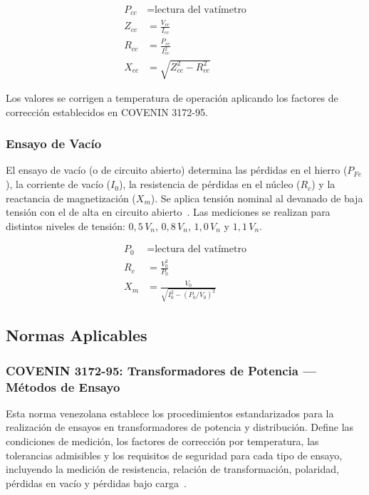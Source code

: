\begin{align}
    P_{cc} &= \text{lectura del vatímetro} \\
    Z_{cc} &= \frac{V_{cc}}{I_{cc}} \\
    R_{cc} &= \frac{P_{cc}}{I_{cc}^2} \\
    X_{cc} &= \sqrt{Z_{cc}^2 - R_{cc}^2}
\end{align}

Los valores se corrigen a temperatura de operación aplicando los factores de corrección establecidos en COVENIN 3172-95.

\subsubsection{Ensayo de Vacío}

El ensayo de vacío (o de circuito abierto) determina las pérdidas en el hierro ($P_{Fe}$), la corriente de vacío ($I_0$), la resistencia de pérdidas en el núcleo ($R_c$) y la reactancia de magnetización ($X_m$). Se aplica tensión nominal al devanado de baja tensión con el de alta en circuito abierto~\cite{chapman}. Las mediciones se realizan para distintos niveles de tensión: $0,5\,V_n$, $0,8\,V_n$, $1,0\,V_n$ y $1,1\,V_n$.

\begin{align}
    P_0 &= \text{lectura del vatímetro} \\
    R_c &= \frac{V_0^2}{P_0} \\
    X_m &= \frac{V_0}{\sqrt{I_0^2 - \left(P_0/V_0\right)^2}}
\end{align}

\subsection{Normas Aplicables}

\subsubsection{COVENIN 3172-95: Transformadores de Potencia — Métodos de Ensayo}
Esta norma venezolana establece los procedimientos estandarizados para la realización de ensayos en transformadores de potencia y distribución. Define las condiciones de medición, los factores de corrección por temperatura, las tolerancias admisibles y los requisitos de seguridad para cada tipo de ensayo, incluyendo la medición de resistencia, relación de transformación, polaridad, pérdidas en vacío y pérdidas bajo carga~\cite{covenin}.

